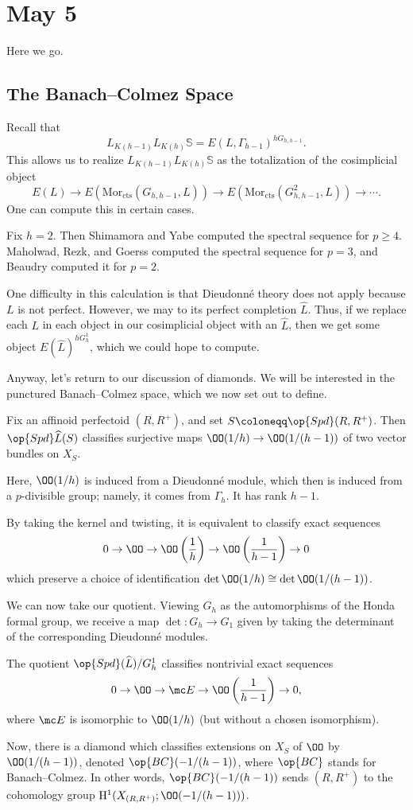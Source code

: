\documentclass[../notes.tex]{subfiles}
\begin{document}
\section{May 5}
Here we go.

\subsection{The Banach--Colmez Space}
Recall that
\[L_{K(h-1)}L_{K(h)}\mathbb S=E(L,\Gamma_{h-1})^{hG_{h,h-1}}.\]
This allows us to realize $L_{K(h-1)}L_{K(h)}\mathbb S$ as the totalization of the cosimplicial object
\[E(L)\to E(\mathrm{Mor}_{\mathrm{cts}}(G_{h,h-1},L))\to E(\mathrm{Mor}_{\mathrm{cts}}(G_{h,h-1}^2,L))\to\cdots.\]
One can compute this in certain cases.
\begin{remark}
	Fix $h=2$. Then Shimamora and Yabe computed the spectral sequence for $p\ge4$. Maholwad, Rezk, and Goerss computed the spectral sequence for $p=3$, and Beaudry computed it for $p=2$.
\end{remark}
One difficulty in this calculation is that Dieudonn\'e theory does not apply because $L$ is not perfect. However, we may to its perfect completion $\widehat L$. Thus, if we replace each $L$ in each object in our cosimplicial object with an $\widehat L$, then we get some object $E(\widehat L)^{hG^1_h}$, which we could hope to compute.

Anyway, let's return to our discussion of diamonds. We will be interested in the punctured Banach--Colmez space, which we now set out to define.
\begin{theorem}
	Fix an affinoid perfectoid $(R,R^+)$, and set $S\coloneqq\op{Spd}(R,R^+)$. Then $\op{Spd}\widehat L(S)$ classifies surjective maps $\OO(1/h)\to\OO(1/(h-1))$ of two vector bundles on $X_S$.
\end{theorem}
\begin{remark}
	Here, $\OO(1/h)$ is induced from a Dieudonn\'e module, which then is induced from a $p$-divisible group; namely, it comes from $\Gamma_h$. It has rank $h-1$.
\end{remark}
\begin{remark}
	By taking the kernel and twisting, it is equivalent to classify exact sequences
	\[0\to\OO\to\OO\left(\frac1h\right)\to\OO\left(\frac1{h-1}\right)\to0\]
	which preserve a choice of identification $\det\OO(1/h)\cong\det\OO(1/(h-1))$.
\end{remark}
We can now take our quotient. Viewing $G_h$ as the automorphisms of the Honda formal group, we receive a map $\det\colon G_h\to G_1$ given by taking the determinant of the corresponding Dieudonn\'e modules.
\begin{corollary}
	The quotient $\op{Spd}(\widehat L)/G_h^1$ classifies nontrivial exact sequences
	\[0\to\OO\to\mc E\to\OO\left(\frac1{h-1}\right)\to0,\]
	where $\mc E$ is isomorphic to $\OO(1/h)$ (but without a chosen isomorphism).
\end{corollary}
Now, there is a diamond which classifies extensions on $X_S$ of $\OO$ by $\OO(1/(h-1))$, denoted $\op{BC}(-1/(h-1))$, where $\op{BC}$ stands for Banach--Colmez. In other words, $\op{BC}(-1/(h-1))$ sends $(R,R^+)$ to the cohomology group $\mathrm H^1(X_{(R,R^+)};\OO(-1/(h-1)))$.
\end{document}
